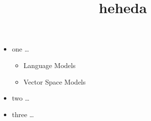 \documentclass[border=2mm,12pt,tikz]{standalone}
\title{heheda}
\begin{document}
\maketitle
    \begin{itemize} 
    \item one \dots{}
         \begin{itemize} 
            \item Language Models
            \item Vector Space Models
         \end{itemize}
    \item two \dots{}
    \item three \dots{}
    \end{itemize}
\end{document}
